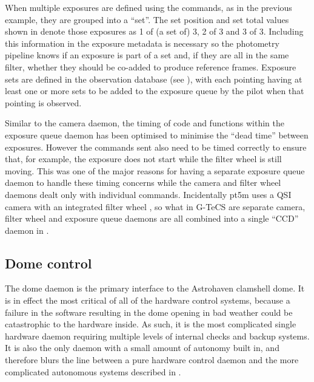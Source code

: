 \begin{colsection}
\begin{colsection}
When multiple exposures are defined using the  commands, as in the previous  example, they are grouped into a ``set''. The set position and set total values shown in  denote those exposures as 1 of (a set of) 3, 2 of 3 and 3 of 3. Including this information in the exposure metadata is necessary so the photometry pipeline knows if an exposure is part of a set and, if they are all in the same filter, whether they should be co-added to produce reference frames. Exposure sets are defined in the observation database (see ), with each pointing having at least one or more sets to be added to the exposure queue by the pilot when that pointing is observed.

Similar to the camera daemon, the timing of code and functions within the exposure queue daemon has been optimised to minimise the ``dead time'' between exposures. However the commands sent also need to be timed correctly to ensure that, for example, the exposure does not start while the filter wheel is still moving. This was one of the major reasons for having a separate exposure queue daemon to handle these timing concerns while the camera and filter wheel daemons dealt only with individual commands. Incidentally pt5m uses a QSI camera with an integrated filter wheel \citep{pt5m}, so what in G-TeCS are separate camera, filter wheel and exposure queue daemons are all combined into a single ``CCD'' daemon in .

\end{colsection}


\subsection{Dome control}
\label{sec:dome}
\begin{colsection}

The dome daemon is the primary interface to the Astrohaven clamshell dome. It is in effect the most critical of all of the hardware control systems, because a failure in the software resulting in the dome opening in bad weather could be catastrophic to the hardware inside. As such, it is the most complicated single hardware daemon requiring multiple levels of internal checks and backup systems. It is also the only daemon with a small amount of autonomy built in, and therefore blurs the line between a pure hardware control daemon and the more complicated autonomous systems described in .


\end{colsection}
\end{colsection}
